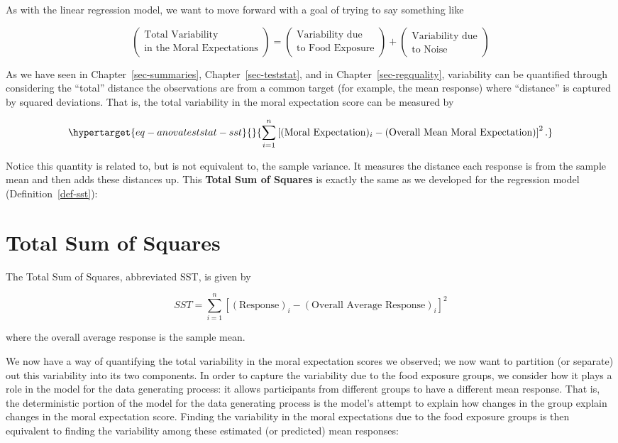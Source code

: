 \documentclass[
  letterpaper,
  DIV=11,
  numbers=noendperiod]{scrreprt}
\theoremstyle{definition}
\theoremstyle{definition}
\theoremstyle{plain}
\theoremstyle{remark}
\begin{document}
As with the linear regression model, we want to move forward with a goal
of trying to say something like

\[\begin{pmatrix} \text{Total Variability} \\ \text{in the Moral Expectations} \end{pmatrix} = \begin{pmatrix} \text{Variability due} \\ \text{to Food Exposure} \end{pmatrix} + \begin{pmatrix} \text{Variability due} \\ \text{to Noise} \end{pmatrix}\]

As we have seen in Chapter~\ref{sec-summaries},
Chapter~\ref{sec-teststat}, and in Chapter~\ref{sec-regquality},
variability can be quantified through considering the ``total'' distance
the observations are from a common target (for example, the mean
response) where ``distance'' is captured by squared deviations. That is,
the total variability in the moral expectation score can be measured by

\begin{equation}\protect\hypertarget{eq-anovateststat-sst}{}{\sum_{i=1}^{n} \left[(\text{Moral Expectation})_i - (\text{Overall Mean Moral Expectation})\right]^2.}\label{eq-anovateststat-sst}\end{equation}

Notice this quantity is related to, but is not equivalent to, the sample
variance. It measures the distance each response is from the sample mean
and then adds these distances up. This \textbf{Total Sum of Squares} is
exactly the same as we developed for the regression model
(Definition~\ref{def-sst}):

\hypertarget{total-sum-of-squares-1}{%
\section{Total Sum of Squares}\label{total-sum-of-squares-1}}

The Total Sum of Squares, abbreviated SST, is given by

\[SST = \sum_{i=1}^{n} \left[(\text{Response})_i - (\text{Overall Average Response})_i\right]^2\]

where the overall average response is the sample mean.

We now have a way of quantifying the total variability in the moral
expectation scores we observed; we now want to partition (or separate)
out this variability into its two components. In order to capture the
variability due to the food exposure groups, we consider how it plays a
role in the model for the data generating process: it allows
participants from different groups to have a different mean response.
That is, the deterministic portion of the model for the data generating
process is the model's attempt to explain how changes in the group
explain changes in the moral expectation score. Finding the variability
in the moral expectations due to the food exposure groups is then
equivalent to finding the variability among these estimated (or
predicted) mean responses:
\end{document}
